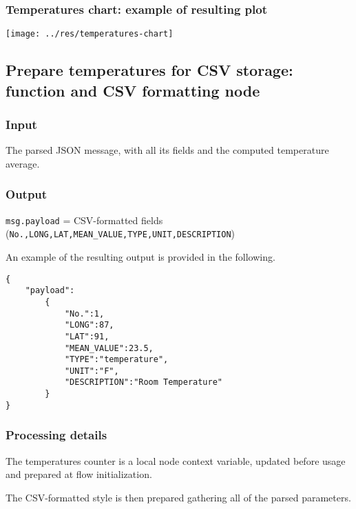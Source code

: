 \documentclass[a4paper,11pt]{article} %
\begin{document}
    \subsubsection{Temperatures chart: example of resulting plot}

    \texttt{[image: ../res/temperatures-chart]}

    \subsection{Prepare temperatures for CSV storage: function and CSV formatting node}\label{subsec:prepare-temperatures-for-csv-storage:-function-and-csv-formatting-node}

    \subsubsection{Input}

    The parsed JSON message, with all its fields and the computed temperature average.

    \subsubsection{Output}

    \texttt{msg.payload} = CSV-formatted fields (\texttt{No.,LONG,LAT,MEAN\_VALUE,TYPE,UNIT,DESCRIPTION})

    \medskip

    An example of the resulting output is provided in the following.

    \begin{verbatim}
{
    "payload":
        {
            "No.":1,
            "LONG":87,
            "LAT":91,
            "MEAN_VALUE":23.5,
            "TYPE":"temperature",
            "UNIT":"F",
            "DESCRIPTION":"Room Temperature"
        }
}
    \end{verbatim}

    \subsubsection{Processing details}

    The temperatures counter is a local node context variable, updated before usage and prepared at flow initialization.

    \smallskip

    The CSV-formatted style is then prepared gathering all of the parsed parameters.
\end{document}

